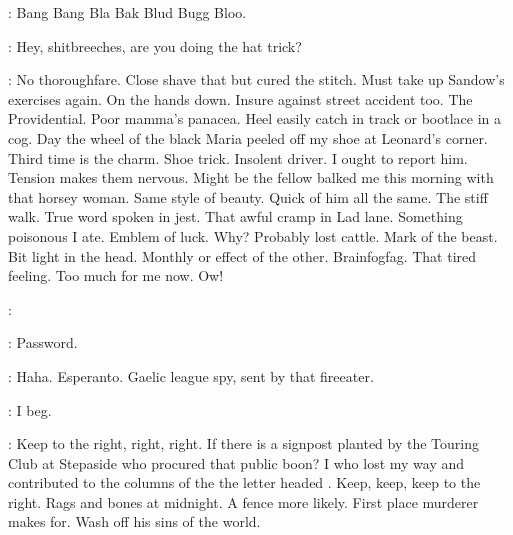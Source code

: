 \Gong:
Bang Bang Bla Bak Blud Bugg Bloo.


\Motorman:
Hey, shitbreeches, are you doing the hat trick?

\Bloom:
No thoroughfare.
Close shave that but cured the stitch.
Must take up Sandow's exercises again.
On the hands down.
Insure against street accident too.
The Providential.
Poor mamma's panacea.
Heel easily catch in track or bootlace in a cog.
Day the wheel of the black Maria peeled off my shoe at Leonard's corner.
Third time is the charm.
Shoe trick.
Insolent driver.
I ought to report him.
Tension makes them nervous.
Might be the fellow balked me this morning with that horsey woman.
Same style of beauty.
Quick of him all the same.
The stiff walk.
True word spoken in jest.
That awful cramp in Lad lane.
Something poisonous I ate.
Emblem of luck.
Why? Probably lost cattle.
Mark of the beast.
Bit light in the head.
Monthly or effect of the other.
Brainfogfag.
That tired feeling.
Too much for me now.
Ow!


\Bloom:

\Figure:
Password. 

\Bloom:
Haha.
Esperanto.
Gaelic league spy, sent by that fireeater.


\Bloom:
I beg.

\Bloom:
Keep to the right, right, right.
If there is a signpost planted by the Touring Club at Stepaside
who procured that public boon?
I who lost my way and contributed to the columns of the 
the letter headed .
Keep, keep, keep to the right.
Rags and bones at midnight.
A fence more likely.
First place murderer makes for.
Wash off his sins of the world.

